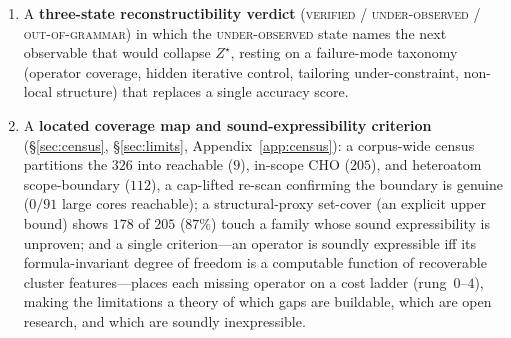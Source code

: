 \documentclass[11pt]{article}
\theoremstyle{definition}
\begin{document}
\begin{enumerate}[leftmargin=1.4em,itemsep=2pt]
quantity $\kappa_O$ at one observability frontier $\mathcal{F}_O$; instantiated on PKS, NRPS, and hybrid
grammars and predicted to survive on RiPP (Corollary~\ref{cor:crossfamily}).
\item A \textbf{three-state reconstructibility verdict} (\textsc{verified} / \textsc{under-observed}
/ \textsc{out-of-grammar}) in which the \textsc{under-observed} state names the next observable that
would collapse $Z^\star$, resting on a failure-mode taxonomy (operator coverage, hidden iterative
control, tailoring under-constraint, non-local structure) that replaces a single accuracy score.
\item A \textbf{located coverage map and sound-expressibility criterion}
(\S\ref{sec:census}, \S\ref{sec:limits}, Appendix~\ref{app:census}): a corpus-wide census partitions the
$326$ into reachable ($9$), in-scope CHO ($205$), and heteroatom scope-boundary ($112$), a cap-lifted
re-scan confirming the boundary is genuine ($0/91$ large cores reachable); a structural-proxy set-cover
(an explicit upper bound) shows $178$ of $205$ ($87\%$) touch a family whose sound expressibility is
unproven; and a single criterion---an operator is soundly expressible iff its formula-invariant degree
of freedom is a computable function of recoverable cluster features---places each missing operator on a
cost ladder (rung~$0$--$4$), making the limitations a theory of which gaps are buildable, which are open
research, and which are soundly inexpressible.
\end{enumerate}
\end{document}
